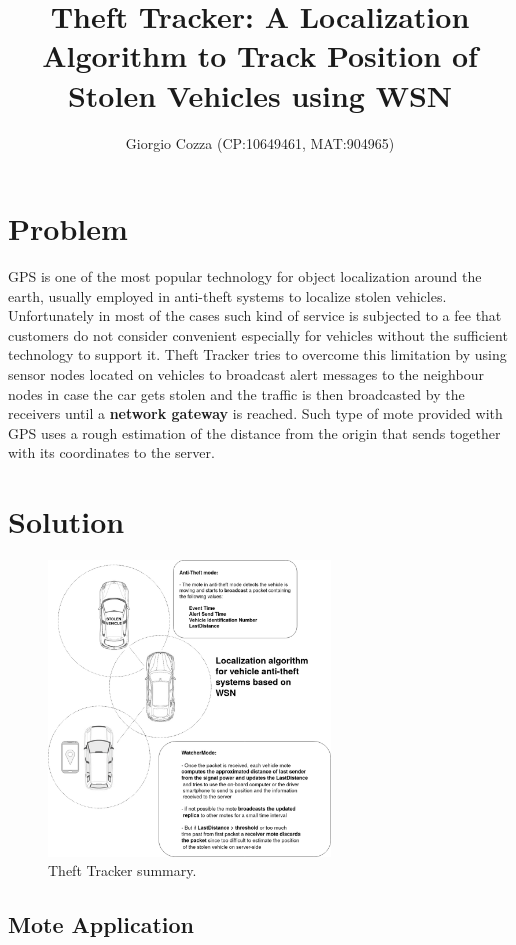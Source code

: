 \documentclass[]{article}
\title{Theft Tracker: A Localization Algorithm to Track Position of Stolen Vehicles using WSN}
\author{Giorgio Cozza (CP:10649461, MAT:904965)}
\begin{document}
\maketitle

\section{Problem}

GPS is one of the most popular technology for object localization around the earth, usually employed in anti-theft systems to localize stolen vehicles. Unfortunately in most of the cases such kind of service is subjected to a fee that customers do not consider convenient especially for vehicles without the sufficient technology to support it. 
Theft Tracker tries to overcome this limitation by using sensor nodes located on vehicles to broadcast alert messages to the neighbour nodes in case the car gets stolen and the traffic is then broadcasted by the receivers until a \textbf{network gateway} is reached. Such type of mote provided with GPS uses a rough estimation of the distance from the origin that sends together with its coordinates to the server.


\section{Solution}

\begin{figure}
\vspace{-50pt}
\includegraphics[width=7.5cm]{./images/tt_summary.png}
\caption{Theft Tracker summary.}\label{tt-fig:1}
\vspace{-70pt}
\end{figure}

\subsection{Mote Application}
\end{document}
